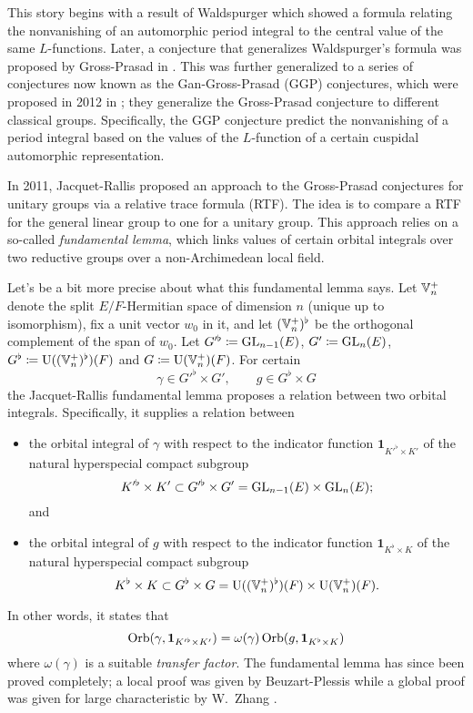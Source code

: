 This story begins with a result of
Waldspurger \cite{ref:waldspurger} which showed a formula
relating the nonvanishing of an automorphic period integral
to the central value of the same $L$-functions.
Later, a conjecture that generalizes Waldspurger's formula
was proposed by Gross-Prasad in \cite{ref:GP1,ref:GP2}.
This was further generalized to a series of conjectures
now known as the Gan-Gross-Prasad (GGP) conjectures,
which were proposed in 2012 in \cite{ref:GGP};
they generalize the Gross-Prasad conjecture to different classical groups.
Specifically, the GGP conjecture predict the nonvanishing of a period integral
based on the values of the $L$-function of a certain cuspidal automorphic representation.

In 2011, Jacquet-Rallis \cite{ref:JR} proposed an approach to the Gross-Prasad conjectures
for unitary groups via a relative trace formula (RTF).
The idea is to compare a RTF for the general linear group to one for a unitary group.
This approach relies on a so-called \emph{fundamental lemma},
which links values of certain orbital integrals
over two reductive groups over a non-Archimedean local field.

Let's be a bit more precise about what this fundamental lemma says.
Let $\mathbb V_n^+$ denote the split $E/F$-Hermitian space of dimension $n$ (unique up to isomorphism),
fix a unit vector $w_0$ in it,
and let $(\mathbb V_n^+)^\flat$ be the orthogonal complement of the span of $w_0$.
Let $G'^\flat \coloneqq \operatorname{GL}_{n-1}(E)$, $G' \coloneqq \operatorname{GL}_n(E)$,
$G^\flat \coloneqq \operatorname{U}((\mathbb V_n^+)^\flat)(F)$ and $G \coloneqq \operatorname{U}(\mathbb V_n^+)(F)$.
For certain
\[ \gamma \in G'^\flat \times G', \qquad g \in G^\flat \times G \]
the Jacquet-Rallis fundamental lemma proposes a relation between two orbital integrals.
Specifically, it supplies a relation between
\begin{itemize}
\item the orbital integral of $\gamma$ with respect to
  the indicator function $\mathbf{1}_{K'^\flat \times K'}$
  of the natural hyperspecial compact subgroup
  \[ K'^\flat \times K' \subset G'^\flat \times G' = \operatorname{GL}_{n-1}(E) \times \operatorname{GL}_n(E); \]
  and
\item the orbital integral of $g$ with respect to
  the indicator function $\mathbf{1}_{K^\flat \times K}$
  of the natural hyperspecial compact subgroup
  \[ K^\flat \times K \subset G^\flat \times G = \operatorname{U}((\mathbb V_n^+)^\flat)(F) \times \operatorname{U}(\mathbb V_n^+)(F). \]
\end{itemize}
In other words, it states that
\begin{equation}
  \operatorname{Orb}(\gamma, \mathbf{1}_{K'^\flat \times K'}) = \omega(\gamma) \operatorname{Orb}(g, \mathbf{1}_{K^\flat \times K})
  \label{eq:old_FL}
\end{equation}
where $\omega(\gamma)$ is a suitable \emph{transfer factor}.
The fundamental lemma has since been proved completely;
a local proof was given by Beuzart-Plessis \cite{ref:BeuzartPlessis}
while a global proof was given for large characteristic by W.\ Zhang \cite{ref:Wei2021}.

